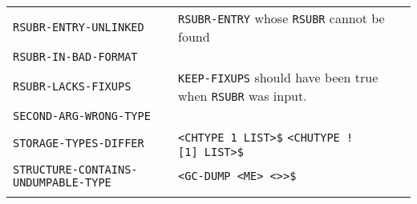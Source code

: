 \documentclass[a4paper,]{article}
\begin{document}
\begin{longtable}[]{@{}ll@{}}
\begin{minipage}[t]{0.58\columnwidth}\raggedright\strut
\texttt{RSUBR-ENTRY-UNLINKED}\strut
\end{minipage} & \begin{minipage}[t]{0.36\columnwidth}\raggedright\strut
\texttt{RSUBR-ENTRY} whose \texttt{RSUBR} cannot be found\strut
\end{minipage}\tabularnewline
\begin{minipage}[t]{0.58\columnwidth}\raggedright\strut
\texttt{RSUBR-IN-BAD-FORMAT}\strut
\end{minipage} & \begin{minipage}[t]{0.36\columnwidth}\raggedright\strut
\strut
\end{minipage}\tabularnewline
\begin{minipage}[t]{0.58\columnwidth}\raggedright\strut
\texttt{RSUBR-LACKS-FIXUPS}\strut
\end{minipage} & \begin{minipage}[t]{0.36\columnwidth}\raggedright\strut
\texttt{KEEP-FIXUPS} should have been true when \texttt{RSUBR} was input.\strut
\end{minipage}\tabularnewline
\begin{minipage}[t]{0.58\columnwidth}\raggedright\strut
\texttt{SECOND-ARG-WRONG-TYPE}\strut
\end{minipage} & \begin{minipage}[t]{0.36\columnwidth}\raggedright\strut
\strut
\end{minipage}\tabularnewline
\begin{minipage}[t]{0.58\columnwidth}\raggedright\strut
\texttt{STORAGE-TYPES-DIFFER}\strut
\end{minipage} & \begin{minipage}[t]{0.36\columnwidth}\raggedright\strut
\texttt{\textless{}CHTYPE\ 1\ LIST\textgreater{}\$}
\texttt{\textless{}CHUTYPE\ \textquotesingle{}!{[}1{]}\ LIST\textgreater{}\$}\strut
\end{minipage}\tabularnewline
\begin{minipage}[t]{0.58\columnwidth}\raggedright\strut
\texttt{STRUCTURE-CONTAINS-UNDUMPABLE-TYPE}\strut
\end{minipage} & \begin{minipage}[t]{0.36\columnwidth}\raggedright\strut
\texttt{\textless{}GC-DUMP\ \textless{}ME\textgreater{}\ \textless{}\textgreater{}\textgreater{}\$}\strut
\end{minipage}\tabularnewline
\begin{minipage}[t]{0.58\columnwidth}\raggedright\strut

\end{minipage}
\end{longtable}
\end{document}
